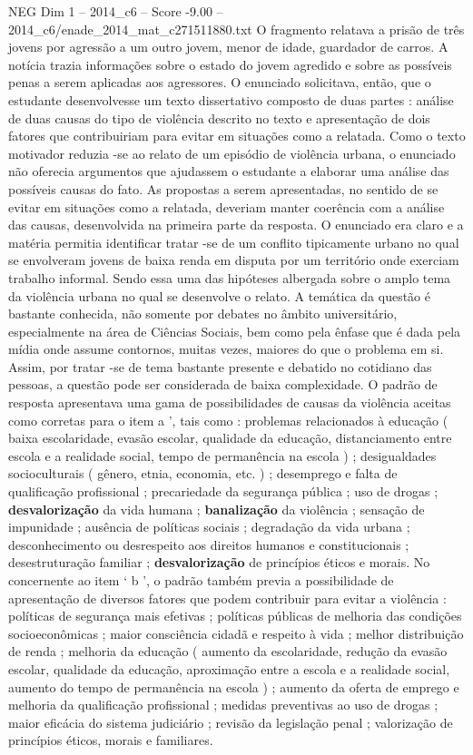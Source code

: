 \begin{textsample}{NEG Dim 1 – 2014\_c6 – Score -9.00 – 2014\_c6/enade\_2014\_mat\_c271511880.txt}
O fragmento relatava a prisão de três jovens por agressão a um outro jovem, menor de idade, guardador de carros.
A notícia trazia informações sobre o estado do jovem agredido e sobre as possíveis penas a serem aplicadas aos agressores.
O enunciado solicitava, então, que o estudante desenvolvesse um texto dissertativo composto de duas partes : análise de duas causas do tipo de violência descrito no texto e apresentação de dois fatores que contribuiriam para evitar em situações como a relatada.
Como o texto motivador reduzia -se ao relato de um episódio de violência urbana, o enunciado não oferecia argumentos que ajudassem o estudante a elaborar uma análise das possíveis causas do fato.
As propostas a serem apresentadas, no sentido de se evitar em situações como a relatada, deveriam manter coerência com a análise das causas, desenvolvida na primeira parte da resposta.
O enunciado era claro e a matéria permitia identificar tratar -se de um conflito tipicamente urbano no qual se envolveram jovens de baixa renda em disputa por um território onde exerciam trabalho informal.
Sendo essa uma das hipóteses albergada sobre o amplo tema da violência urbana no qual se desenvolve o relato.
A temática da questão é bastante conhecida, não somente por debates no âmbito universitário, especialmente na área de Ciências Sociais, bem como pela ênfase que é dada pela mídia onde assume contornos, muitas vezes, maiores do que o problema em si.
Assim, por tratar -se de tema bastante presente e debatido no cotidiano das pessoas, a questão pode ser considerada de baixa complexidade.
O padrão de resposta apresentava uma gama de possibilidades de causas da violência aceitas como corretas para o item a ’, tais como : problemas relacionados à educação ( baixa escolaridade, evasão escolar, qualidade da educação, distanciamento entre escola e a realidade social, tempo de permanência na escola ) ; desigualdades socioculturais ( gênero, etnia, economia, etc. ) ; desemprego e falta de qualificação profissional ; precariedade da segurança pública ; uso de drogas ; \textbf{desvalorização} da vida humana ; \textbf{banalização} da violência ; sensação de impunidade ; ausência de políticas sociais ; degradação da vida urbana ; desconhecimento ou desrespeito aos direitos humanos e constitucionais ; desestruturação familiar ; \textbf{desvalorização} de princípios éticos e morais.
No concernente ao item ‘ b ’, o padrão também previa a possibilidade de apresentação de diversos fatores que podem contribuir para evitar a violência : políticas de segurança mais efetivas ; políticas públicas de melhoria das condições socioeconômicas ; maior consciência cidadã e respeito à vida ; melhor distribuição de renda ; melhoria da educação ( aumento da escolaridade, redução da evasão escolar, qualidade da educação, aproximação entre a escola e a realidade social, aumento do tempo de permanência na escola ) ; aumento da oferta de emprego e melhoria da qualificação profissional ; medidas preventivas ao uso de drogas ; maior eficácia do sistema judiciário ; revisão da legislação penal ; valorização de princípios éticos, morais e familiares.

\end{textsample}
